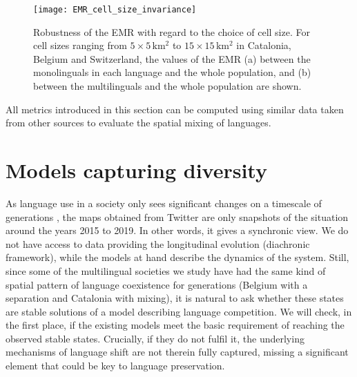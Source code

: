\documentclass[../thesis.tex]{subfiles}
\begin{document}
\begin{figure}[h!]
  \centering
  \texttt{[image: EMR\_cell\_size\_invariance]}
  \caption{Robustness of the \ac{EMR} with regard to the choice of cell size. For cell
  sizes ranging from $5 \times 5 \, \si{\kilo \meter \squared}$ to $15 \times 15 \,
  \si{\kilo \meter \squared}$ in Catalonia, Belgium and Switzerland, the values of the
  \ac{EMR} (a) between the monolinguals in each language and the whole population, and
  (b) between the multilinguals and the whole population are shown.}
  \label{fig:EMR_cell_size_invariance}
\end{figure}

All metrics introduced in this section can be computed using similar data taken from
other sources to evaluate the spatial mixing of languages.



\section{Models capturing diversity}
\label{sec:multiling_models}
As language use in a society only sees significant changes on a timescale of generations
\cite{LabovSociolinguisticPatterns1973}, the maps obtained from Twitter are only
snapshots of the situation around the years 2015 to 2019. In other words, it gives a
synchronic view. We do not have access to data providing the longitudinal evolution
(diachronic framework), while the models at hand describe the dynamics of the system.
Still, since some of the multilingual societies we study have had the same kind of
spatial pattern of language coexistence for generations (Belgium with a separation and
Catalonia with mixing), it is natural to ask whether these states are stable solutions
of a model describing language competition. We will check, in the first place, if the
existing models meet the basic requirement of reaching the observed stable states.
Crucially, if they do not fulfil it, the underlying mechanisms of language shift are not
therein fully captured, missing a significant element that could be key to language
preservation.
\end{document}
